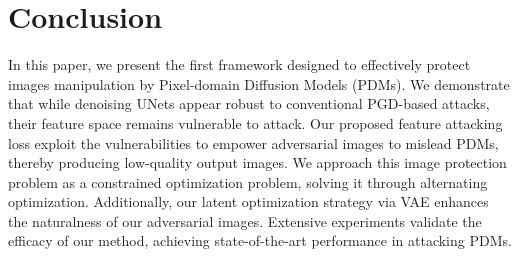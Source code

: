 \section{Conclusion}

In this paper, we present the first framework designed to effectively protect images manipulation by Pixel-domain Diffusion Models (PDMs). We demonstrate that while denoising UNets appear robust to conventional PGD-based attacks, their feature space remains vulnerable to attack. Our proposed feature attacking loss exploit the vulnerabilities to empower adversarial images to mislead PDMs, thereby producing low-quality output images. We approach this image protection problem as a constrained optimization problem, solving it through alternating optimization. Additionally, our latent optimization strategy via VAE enhances the naturalness of our adversarial images. Extensive experiments validate the efficacy of our method, achieving state-of-the-art performance in attacking PDMs.
